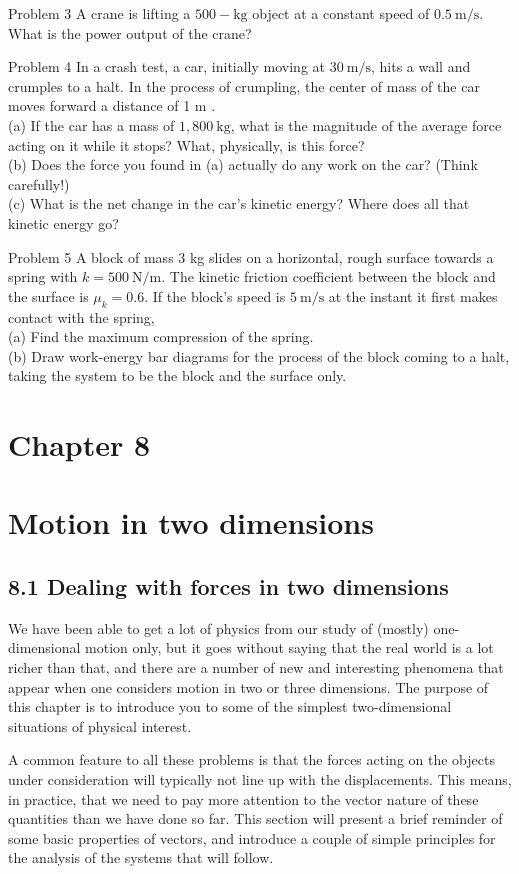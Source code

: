 \documentclass[10pt]{article}
\begin{document}
Problem 3 A crane is lifting a $500-\mathrm{kg}$ object at a constant speed of $0.5 \mathrm{~m} / \mathrm{s}$. What is the power output of the crane?

Problem 4 In a crash test, a car, initially moving at $30 \mathrm{~m} / \mathrm{s}$, hits a wall and crumples to a halt. In the process of crumpling, the center of mass of the car moves forward a distance of 1 m .\\
(a) If the car has a mass of $1,800 \mathrm{~kg}$, what is the magnitude of the average force acting on it while it stops? What, physically, is this force?\\
(b) Does the force you found in (a) actually do any work on the car? (Think carefully!)\\
(c) What is the net change in the car's kinetic energy? Where does all that kinetic energy go?

Problem 5 A block of mass 3 kg slides on a horizontal, rough surface towards a spring with $k=500 \mathrm{~N} / \mathrm{m}$. The kinetic friction coefficient between the block and the surface is $\mu_{k}=0.6$. If the block's speed is $5 \mathrm{~m} / \mathrm{s}$ at the instant it first makes contact with the spring,\\
(a) Find the maximum compression of the spring.\\
(b) Draw work-energy bar diagrams for the process of the block coming to a halt, taking the system to be the block and the surface only.

\section*{Chapter 8}
\section*{Motion in two dimensions}
\subsection*{8.1 Dealing with forces in two dimensions}
We have been able to get a lot of physics from our study of (mostly) one-dimensional motion only, but it goes without saying that the real world is a lot richer than that, and there are a number of new and interesting phenomena that appear when one considers motion in two or three dimensions. The purpose of this chapter is to introduce you to some of the simplest two-dimensional situations of physical interest.

A common feature to all these problems is that the forces acting on the objects under consideration will typically not line up with the displacements. This means, in practice, that we need to pay more attention to the vector nature of these quantities than we have done so far. This section will present a brief reminder of some basic properties of vectors, and introduce a couple of simple principles for the analysis of the systems that will follow.
\end{document}
